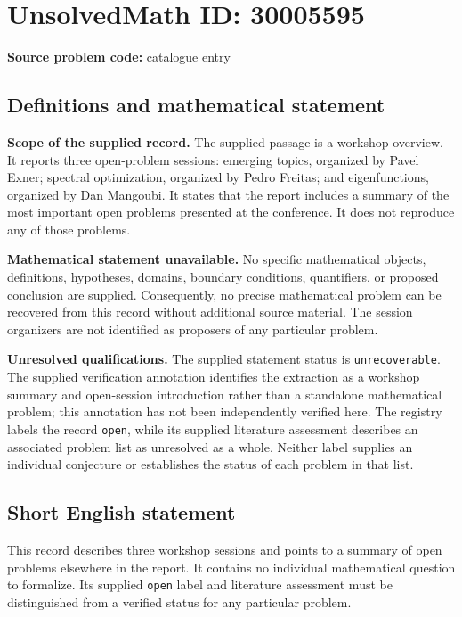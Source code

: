 \documentclass[11pt]{article}
\begin{document}
\section*{UnsolvedMath ID: 30005595}
\textbf{Source problem code:} catalogue entry
\subsection{Definitions and mathematical statement}
\textbf{Scope of the supplied record.} The supplied passage is a workshop overview. It reports three open-problem sessions: emerging topics, organized by Pavel Exner; spectral optimization, organized by Pedro Freitas; and eigenfunctions, organized by Dan Mangoubi. It states that the report includes a summary of the most important open problems presented at the conference. It does not reproduce any of those problems.

\textbf{Mathematical statement unavailable.} No specific mathematical objects, definitions, hypotheses, domains, boundary conditions, quantifiers, or proposed conclusion are supplied. Consequently, no precise mathematical problem can be recovered from this record without additional source material. The session organizers are not identified as proposers of any particular problem.

\textbf{Unresolved qualifications.} The supplied statement status is \texttt{unrecoverable}. The supplied verification annotation identifies the extraction as a workshop summary and open-session introduction rather than a standalone mathematical problem; this annotation has not been independently verified here. The registry labels the record \texttt{open}, while its supplied literature assessment describes an associated problem list as unresolved as a whole. Neither label supplies an individual conjecture or establishes the status of each problem in that list.
\subsection{Short English statement}
This record describes three workshop sessions and points to a summary of open problems elsewhere in the report. It contains no individual mathematical question to formalize. Its supplied \texttt{open} label and literature assessment must be distinguished from a verified status for any particular problem.
\end{document}
